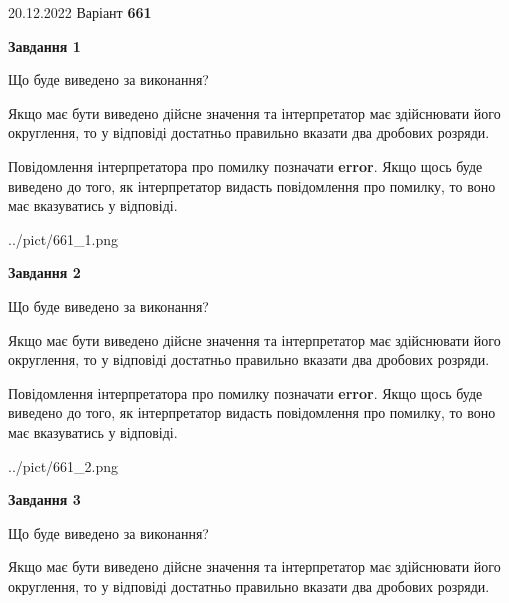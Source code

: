 \documentclass[12pt, ukrainian]{article}
\begin{document}
{20.12.2022 Варіант \No \textbf { 661 }\par}
{
\begin {Large}

{\begin {center}\textbf{Завдання 1}\end {center}}\par
Що буде виведено за виконання? \par

Якщо має бути виведено дійсне значення та інтерпретатор має здійснювати його округлення, 
то у відповіді достатньо правильно вказати два дробових розряди.

Повідомлення інтерпретатора про помилку позначати \textbf{error}.
Якщо щось буде виведено до того, як інтерпретатор видасть повідомлення про помилку, 
то воно має вказуватись у відповіді. \par

\begin{center}
	{../pict/661_1.png}
\end{center}
\newpage

{\begin {center}\textbf{Завдання 2}\end {center}}\par
Що буде виведено за виконання? \par

Якщо має бути виведено дійсне значення та інтерпретатор має здійснювати його округлення, 
то у відповіді достатньо правильно вказати два дробових розряди.

Повідомлення інтерпретатора про помилку позначати \textbf{error}.
Якщо щось буде виведено до того, як інтерпретатор видасть повідомлення про помилку, 
то воно має вказуватись у відповіді. \par

\begin{center}
	{../pict/661_2.png}
\end{center}
\newpage

{\begin {center}\textbf{Завдання 3}\end {center}}\par
Що буде виведено за виконання? \par

Якщо має бути виведено дійсне значення та інтерпретатор має здійснювати його округлення, 
то у відповіді достатньо правильно вказати два дробових розряди.


\end{Large}}
\end{document}
